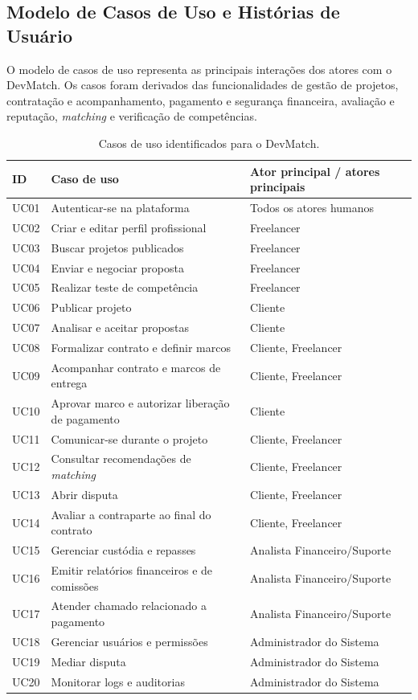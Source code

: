\subsection{Modelo de Casos de Uso e Histórias de Usuário}
\label{sec:casosuso}

O modelo de casos de uso representa as principais interações dos atores com o DevMatch. Os casos foram derivados das funcionalidades de gestão de projetos, contratação e acompanhamento, pagamento e segurança financeira, avaliação e reputação, \textit{matching} e verificação de competências.

\begin{table}[!htbp]
\centering
\caption{Casos de uso identificados para o DevMatch.}
\label{tab:casosuso}
\small
\begin{tabularx}{\textwidth}{@{}p{0.9cm}X p{4.4cm}@{}}
\toprule
\textbf{ID} & \textbf{Caso de uso} & \textbf{Ator principal / atores principais} \\
\midrule
UC01 & Autenticar-se na plataforma & Todos os atores humanos \\
UC02 & Criar e editar perfil profissional & Freelancer \\
UC03 & Buscar projetos publicados & Freelancer \\
UC04 & Enviar e negociar proposta & Freelancer \\
UC05 & Realizar teste de competência & Freelancer \\
UC06 & Publicar projeto & Cliente \\
UC07 & Analisar e aceitar propostas & Cliente \\
UC08 & Formalizar contrato e definir marcos & Cliente, Freelancer \\
UC09 & Acompanhar contrato e marcos de entrega & Cliente, Freelancer \\
UC10 & Aprovar marco e autorizar liberação de pagamento & Cliente \\
UC11 & Comunicar-se durante o projeto & Cliente, Freelancer \\
UC12 & Consultar recomendações de \textit{matching} & Cliente, Freelancer \\
UC13 & Abrir disputa & Cliente, Freelancer \\
UC14 & Avaliar a contraparte ao final do contrato & Cliente, Freelancer \\
UC15 & Gerenciar custódia e repasses & Analista Financeiro/Suporte \\
UC16 & Emitir relatórios financeiros e de comissões & Analista Financeiro/Suporte \\
UC17 & Atender chamado relacionado a pagamento & Analista Financeiro/Suporte \\
UC18 & Gerenciar usuários e permissões & Administrador do Sistema \\
UC19 & Mediar disputa & Administrador do Sistema \\
UC20 & Monitorar logs e auditorias & Administrador do Sistema \\
\bottomrule
\end{tabularx}
\end{table}

